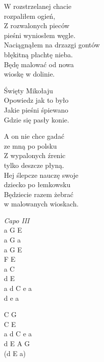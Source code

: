 \begin{text}
    \chordfill
    W rozstrzelanej chacie\\
    rozpaliłem ogień,\\
    Z rozwalonych pieców\\
    pieśni wyniosłem węgle.\\
    Naciągnąłem na drzazgi gontów\\
    błękitną płachtę nieba.\\
    Będę malować od nowa\\
    wioskę w dolinie.

    \vin Święty Mikołaju\\
    \vin Opowiedz jak to było\\
    \vin Jakie pieśni śpiewano\\
    \vin Gdzie się pasły konie.

    A on nie chce gadać\\
    ze mną po polsku\\
    Z wypalonych źrenic\\
    tylko deszcze płyną.\\
    Hej ślepcze nauczę swoje\\
    dziecko po łemkowsku\\
    Będziecie razem żebrać\\
    w malowanych wioskach.
\end{text}
\begin{chord}
    \textit{Capo III}\\
    a G E\\
    a G a\\
    a G E\\
    F E\\
    a C\\
    d E\\
    a d C e a\\
    d e a

    C G\\
    C E\\
    a d C e a\\
    d E A G\\
    (d E a)
\end{chord}